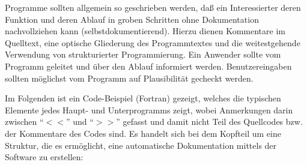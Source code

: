 Programme sollten allgemein so geschrieben werden, daß ein Interessierter deren Funktion und deren Ablauf in 
groben Schritten ohne Dokumentation nachvollziehen kann (selbstdokumentierend). Hierzu dienen Kommentare im Quelltext,
eine optische Gliederung des Programmtextes und die weitestgehende Verwendung von strukturierter
Programmierung. Ein Anwender sollte vom Programm geleitet und über den Ablauf informiert werden. Benutzereingaben
sollten möglichst vom Programm auf Plausibilität gecheckt werden.

Im Folgenden ist ein Code-Beispiel (Fortran) gezeigt, welches die typischen Elemente jedes Haupt- und Unterprogramms zeigt, wobei Anmerkungen darin zwischen  
``$<<$'' und ``$>>$'' gefasst und damit nicht Teil des Quellcodes bzw. der Kommentare des Codes sind. Es handelt sich bei dem Kopfteil um eine Struktur,
die es ermöglicht, eine automatische Dokumentation mittels der Software  zu erstellen:


